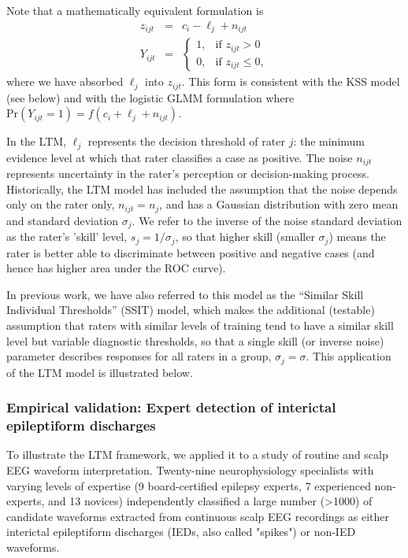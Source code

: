 Note that a mathematically equivalent formulation is
\begin{eqnarray*}
  z_{ijt} &=& c_i - \ell_j + n_{ijt} \\
  Y_{ijt}&=&\begin{cases}
    1, & \text{if $z_{ijt}>0$}\\
    0, & \text{if $z_{ijt}\leq 0$},
  \end{cases}
\end{eqnarray*}
where we have absorbed $\ell_j$ into $z_{ijt}$. This form is consistent with the KSS model (see below) and with the logistic GLMM formulation where $\text{Pr}(Y_{ijt}=1) = f(c_i + \ell_j + n_{ijt})$.

In the LTM, $\ell_j$ represents the decision threshold of rater $j$: the minimum evidence level at which that rater classifies a case as positive. The noise $n_{ijt}$ represents uncertainty in the rater's perception or decision-making process. Historically, the LTM model has included the assumption that the noise depends only on the rater only, $n_{ijt} = n_j$, and has a Gaussian distribution with zero mean and standard deviation $\sigma_j$. We refer to the inverse of the noise standard deviation as the rater's 'skill' level, $s_j = 1/\sigma_j$, so that higher skill (smaller $\sigma_j$) means the rater is better able to discriminate between positive and negative cases (and hence has higher area under the ROC curve). 

In previous work, we have also referred to this model as the ``Similar Skill Individual Thresholds'' (SSIT) model, which makes the additional (testable) assumption that raters with similar levels of training tend to have a similar skill level but variable diagnostic thresholds, so that a single skill (or inverse noise) parameter describes responses for all raters in a group,  $\sigma_j = \sigma$. This application of the LTM model is illustrated below.

\subsubsection*{Empirical validation: Expert detection of interictal epileptiform discharges}

To illustrate the LTM framework, we applied it to a study of routine and scalp EEG waveform interpretation. Twenty-nine neurophysiology specialists with varying levels of expertise (9 board-certified epilepsy experts, 7 experienced non-experts, and 13 novices) independently classified a large number (>1000) of candidate waveforms extracted from continuous scalp EEG recordings as either interictal epileptiform discharges (IEDs, also called "spikes") or non-IED waveforms.

